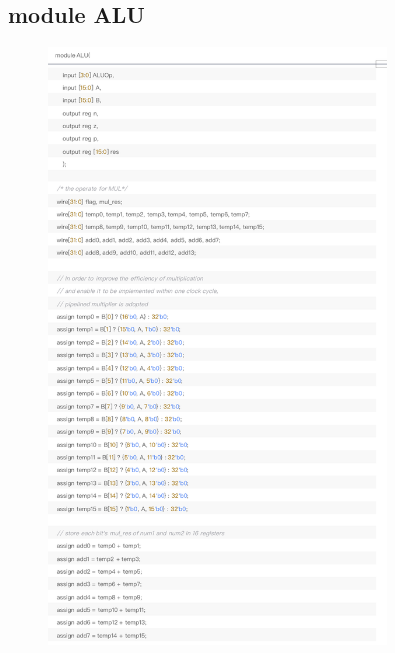\documentclass{article}
\begin{document}
\subsection{module ALU}
\begin{figure}[H]
    \centering
    \includegraphics[width=0.8\textwidth]{pic/13.png}
  
    \end{figure}
\end{document}
